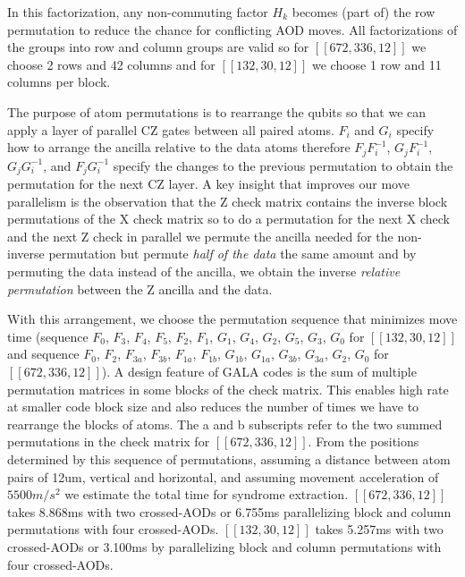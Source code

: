 In this factorization, any non-commuting factor $H_k$ becomes (part of) the row permutation to reduce the chance for conflicting AOD moves. All factorizations of the groups into row and column groups are valid so for $[[672,336,12]]$ we choose 2 rows and 42 columns and for $[[132,30,12]]$ we choose 1 row and 11 columns per block.

The purpose of atom permutations is to rearrange the qubits so that we can apply a layer of parallel CZ gates between all paired atoms. $F_i$ and $G_i$ specify how to arrange the ancilla relative to the data atoms therefore $F_j F^{-1}_i$, $G_j F^{-1}_i$, $G_j G^{-1}_i$, and $F_j G^{-1}_i$ specify the changes to the previous permutation to obtain the permutation for the next CZ layer. A key insight that improves our move parallelism is the observation that the Z check matrix contains the inverse block permutations of the X check matrix so to do a permutation for the next X check and the next Z check in parallel we permute the ancilla needed for the non-inverse permutation but permute \textit{half of the data} the same amount and by permuting the data instead of the ancilla, we obtain the inverse \textit{relative permutation} between the Z ancilla and the data.

With this arrangement, we choose the permutation sequence that minimizes move time (sequence $F_0$, $F_3$, $F_4$, $F_5$, $F_2$, $F_1$, $G_1$, $G_4$, $G_2$, $G_5$, $G_3$, $G_0$ for $[[132,30,12]]$ and sequence $F_0$, $F_2$, $F_{3a}$, $F_{3b}$, $F_{1a}$, $F_{1b}$, $G_{1b}$, $G_{1a}$, $G_{3b}$, $G_{3a}$, $G_{2}$, $G_{0}$ for $[[672,336,12]]$). A design feature of GALA codes is the sum of multiple permutation matrices in some blocks of the check matrix. This enables high rate at smaller code block size and also reduces the number of times we have to rearrange the blocks of atoms. The a and b subscripts refer to the two summed permutations in the check matrix for $[[672,336,12]]$. From the positions determined by this sequence of permutations, assuming a distance between atom pairs of 12um, vertical and horizontal, and assuming movement acceleration of $5500 m/s^2$ \cite{zhou2025resource} we estimate the total time for syndrome extraction. $[[672,336,12]]$ takes 8.868ms with two crossed-AODs or 6.755ms parallelizing block and column permutations with four crossed-AODs. $[[132,30,12]]$ takes 5.257ms with two crossed-AODs or 3.100ms by parallelizing block and column permutations with four crossed-AODs.

%


